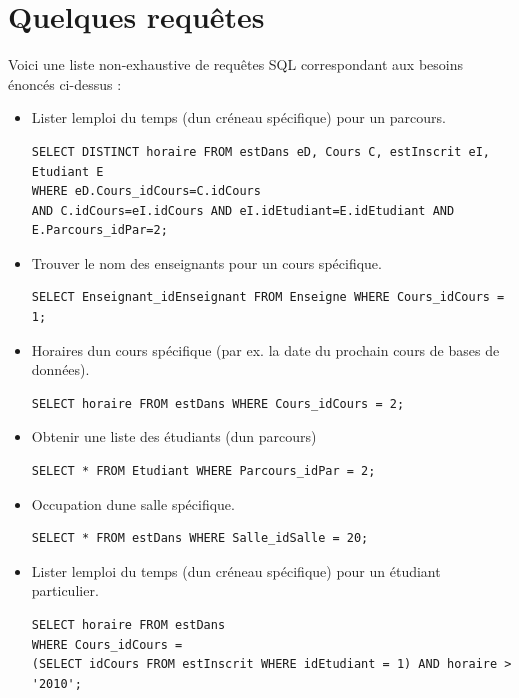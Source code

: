 \documentclass{article}
\begin{document}
\section{Quelques requ\^etes}
Voici une liste non-exhaustive de requ\^etes SQL correspondant aux besoins \'enonc\'es ci-dessus :\\
\begin{itemize}
\item Lister l\textquotesingle emploi du temps (d\textquotesingle un cr\'eneau sp\'ecifique) pour un parcours.\\
\begin{verbatim}
SELECT DISTINCT horaire FROM estDans eD, Cours C, estInscrit eI, Etudiant E 
WHERE eD.Cours_idCours=C.idCours 
AND C.idCours=eI.idCours AND eI.idEtudiant=E.idEtudiant AND E.Parcours_idPar=2;

\end{verbatim}
\item Trouver le nom des enseignants pour un cours sp\'ecifique.\\
\begin{verbatim}
SELECT Enseignant_idEnseignant FROM Enseigne WHERE Cours_idCours = 1;

\end{verbatim}
\item Horaires d\textquotesingle un cours sp\'ecifique (par ex. la date du prochain cours de bases de donn\'ees).\\
\begin{verbatim}
SELECT horaire FROM estDans WHERE Cours_idCours = 2;

\end{verbatim}
\item Obtenir une liste des \'etudiants (d\textquotesingle un parcours)\\
\begin{verbatim}
SELECT * FROM Etudiant WHERE Parcours_idPar = 2;

\end{verbatim}
\item Occupation d\textquotesingle une salle sp\'ecifique.\\
\begin{verbatim}
SELECT * FROM estDans WHERE Salle_idSalle = 20;

\end{verbatim}
\item Lister l\textquotesingle emploi du temps (d\textquotesingle un cr\'eneau sp\'ecifique) pour un \'etudiant particulier.\\
\begin{verbatim}
SELECT horaire FROM estDans 
WHERE Cours_idCours = 
(SELECT idCours FROM estInscrit WHERE idEtudiant = 1) AND horaire > '2010';


\end{verbatim}
\end{itemize}
\end{document}
